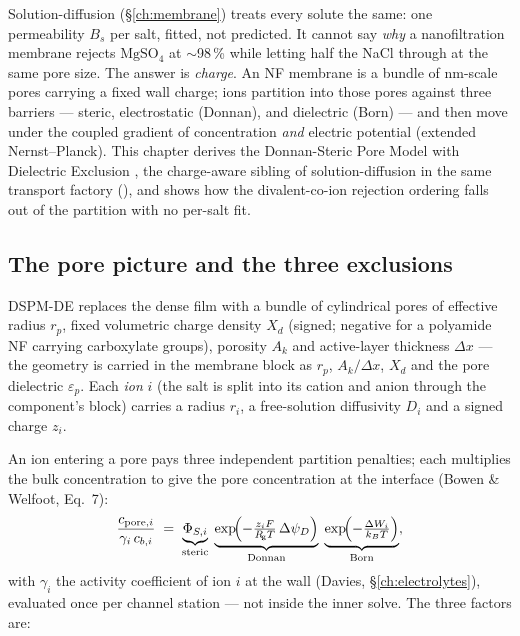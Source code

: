 \documentclass[11pt,a4paper]{article}
\newcommand{\Rgas}{R_{\!\mathrm{g}}}                %
\begin{document}
\begin{whatyoulllearn}
Solution-diffusion (\S\ref{ch:membrane}) treats every solute the same:
one permeability $B_s$ per salt, fitted, not predicted.  It cannot say
\emph{why} a nanofiltration membrane rejects $\mathrm{MgSO_4}$ at
$\sim$98\,\% while letting half the NaCl through at the same pore size.
The answer is \emph{charge}.  An NF membrane is a bundle of nm-scale
pores carrying a fixed wall charge; ions partition into those pores
against three barriers --- steric, electrostatic (Donnan), and
dielectric (Born) --- and then move under the coupled gradient of
concentration \emph{and} electric potential (extended Nernst--Planck).
This chapter derives the Donnan-Steric Pore Model with Dielectric
Exclusion \cite{BowenMohammadHilal1997,BowenWelfoot2002}, the
charge-aware sibling of solution-diffusion in the same transport factory
(), and shows how the divalent-co-ion rejection
ordering falls out of the partition with no per-salt fit.
\end{whatyoulllearn}

\subsection{The pore picture and the three exclusions}

DSPM-DE replaces the dense film with a bundle of cylindrical pores of
effective radius $r_p$, fixed volumetric charge density $X_d$ (signed;
negative for a polyamide NF carrying carboxylate groups), porosity
$A_k$ and active-layer thickness $\Delta x$ --- the geometry is carried
in the membrane   block as $r_p$,
$A_k/\Delta x$, $X_d$ and the pore dielectric $\varepsilon_p$.  Each
\emph{ion} $i$ (the salt is split into its cation and anion through the
component's  block) carries a
radius $r_i$, a free-solution diffusivity $D_i$ and a signed charge
$z_i$.

An ion entering a pore pays three independent partition penalties; each
multiplies the bulk concentration to give the pore concentration at the
interface (Bowen \& Welfoot, Eq.~7):
\begin{equation}
   \frac{c_{\text{pore},i}}{\gamma_i\,c_{b,i}}
   \;=\;
   \underbrace{\Phi_{S,i}}_{\text{steric}}\;
   \underbrace{\exp\!\Bigl(-\tfrac{z_i F}{\Rgas T}\,\Delta\psi_D\Bigr)}_{\text{Donnan}}\;
   \underbrace{\exp\!\Bigl(-\tfrac{\Delta W_i}{k_B T}\Bigr)}_{\text{Born}},
   \label{eq:dspmde-partition}
\end{equation}
with $\gamma_i$ the activity coefficient of ion $i$ at the wall
(Davies, \S\ref{ch:electrolytes}), evaluated once per channel station
--- not inside the inner solve.  The three factors are:
\end{document}

